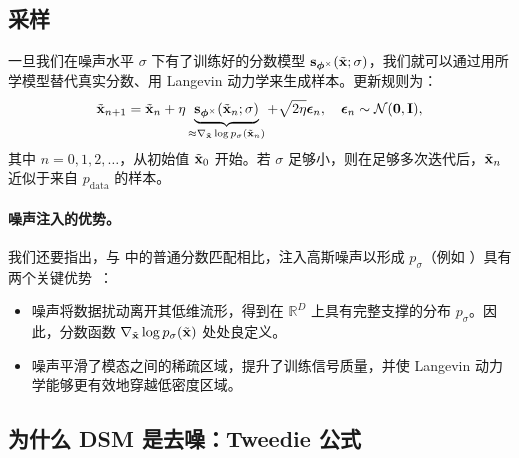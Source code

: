 \subsection{采样} 一旦我们在噪声水平 $\sigma$ 下有了训练好的分数模型 ${\mathbf{s}}_{\bm{\phi}^\times}(\tilde{{\mathbf{x}}}; \sigma)$，我们就可以通过用所学模型替代真实分数、用 Langevin 动力学来生成样本。更新规则为：
\begin{align}\label{eq:score-langevin-emp-dsm}
   \tilde{{\mathbf{x}}}_{n+1} = \tilde{{\mathbf{x}}}_n + \eta \underbrace{{\mathbf{s}}_{\bm{\phi}^\times}(\tilde{{\mathbf{x}}}_n; \sigma)}_{\approx \nabla_{\tilde{{\mathbf{x}}}} \log p_\sigma(\tilde{{\mathbf{x}}}_n)} + \sqrt{2\eta}    \bm{\epsilon}_n, \quad \bm{\epsilon}_n \sim \mathcal{N}(\mathbf{0}, {\mathbf{I}}),
\end{align}
其中 $n = 0, 1, 2, \dots$，从初始值 $\tilde{{\mathbf{x}}}_0$ 开始。若 $\sigma$ 足够小，则在足够多次迭代后，$\tilde{{\mathbf{x}}}_n$ 近似于来自 $p_{\text{data}}$ 的样本。


\paragraph{噪声注入的优势。}
我们还要指出，与  中的普通分数匹配相比，注入高斯噪声以形成 $p_\sigma$（例如 ）具有两个关键优势~\citep{song2019generative}：
\begin{itemize}
  \item {} 噪声将数据扰动离开其低维流形，得到在 $\mathbb{R}^D$ 上具有完整支撑的分布 $p_\sigma$。因此，分数函数 $\nabla_{\tilde{{\mathbf{x}}}} \log p_\sigma(\tilde{{\mathbf{x}}})$ 处处良定义。
  \item {} 噪声平滑了模态之间的稀疏区域，提升了训练信号质量，并使 Langevin 动力学能够更有效地穿越低密度区域。
\end{itemize}


\subsection{为什么 DSM 是去噪：Tweedie 公式}\label{subsec:why-dsm-denoising-tweedie}

